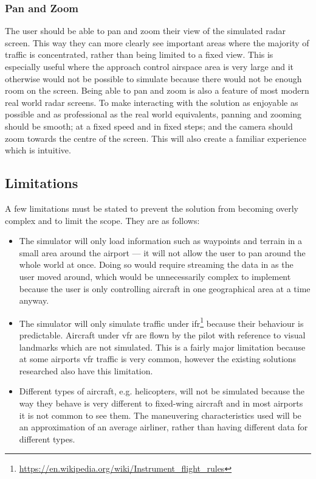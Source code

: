 \documentclass{article}
\begin{document}
\subsubsection{Pan and Zoom}
The user should be able to pan and zoom their view of the simulated radar screen.
This way they can more clearly see important areas where the majority of traffic is concentrated, rather than being limited to a fixed view.
This is especially useful where the approach control airspace area is very large and it otherwise would not be possible to simulate because there would not be enough room on the screen.
Being able to pan and zoom is also a feature of most modern real world radar screens.
To make interacting with the solution as enjoyable as possible and as professional as the real world equivalents, panning and zooming should be smooth; at a fixed speed and in fixed steps; and the camera should zoom towards the centre of the screen.
This will also create a familiar experience which is intuitive.


\subsection{Limitations}
A few limitations must be stated to prevent the solution from becoming overly complex and to limit the scope.
They are as follows:
\begin{itemize}
\item{The simulator will only load information such as waypoints and terrain in a small area around the airport --- it will not allow the user to pan around the whole world at once.
Doing so would require streaming the data in as the user moved around, which would be unnecessarily complex to implement because the user is only controlling aircraft in one geographical area at a time anyway.}
\item{The simulator will only simulate traffic under \acrfull{ifr}\footnote{\url{https://en.wikipedia.org/wiki/Instrument_flight_rules}} because their behaviour is predictable.
Aircraft under \acrfull{vfr} are flown by the pilot with reference to visual landmarks which are not simulated.
This is a fairly major limitation because at some airports \acrshort{vfr} traffic is very common, however the existing solutions researched also have this limitation.}
\item{Different types of aircraft, e.g. helicopters, will not be simulated because the way they behave is very different to fixed-wing aircraft and in most airports it is not common to see them.
The maneuvering characteristics used will be an approximation of an average airliner, rather than having different data for different types.}
\end{itemize}
\end{document}
